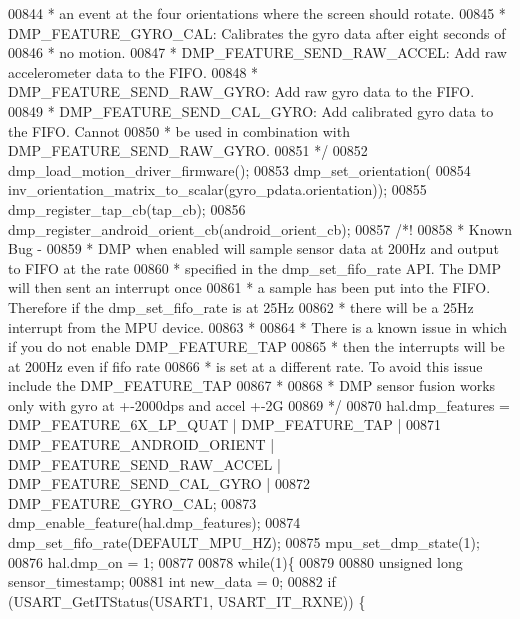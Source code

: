 \begin{DoxyCode}
{{{{{{{{00844 \textcolor{comment}{     * an event at the four orientations where the screen should rotate.}
00845 \textcolor{comment}{     * DMP\_FEATURE\_GYRO\_CAL: Calibrates the gyro data after eight seconds of}
00846 \textcolor{comment}{     * no motion.}
00847 \textcolor{comment}{     * DMP\_FEATURE\_SEND\_RAW\_ACCEL: Add raw accelerometer data to the FIFO.}
00848 \textcolor{comment}{     * DMP\_FEATURE\_SEND\_RAW\_GYRO: Add raw gyro data to the FIFO.}
00849 \textcolor{comment}{     * DMP\_FEATURE\_SEND\_CAL\_GYRO: Add calibrated gyro data to the FIFO. Cannot}
00850 \textcolor{comment}{     * be used in combination with DMP\_FEATURE\_SEND\_RAW\_GYRO.}
00851 \textcolor{comment}{     */}
00852     dmp\_load\_motion\_driver\_firmware();
00853     dmp\_set\_orientation(
00854         inv\_orientation\_matrix\_to\_scalar(gyro\_pdata.orientation));
00855     dmp\_register\_tap\_cb(tap\_cb);
00856     dmp\_register\_android\_orient\_cb(android\_orient\_cb);
00857     \textcolor{comment}{/*!}
00858 \textcolor{comment}{     * Known Bug -}
00859 \textcolor{comment}{     * DMP when enabled will sample sensor data at 200Hz and output to FIFO at the rate}
00860 \textcolor{comment}{     * specified in the dmp\_set\_fifo\_rate API. The DMP will then sent an interrupt once}
00861 \textcolor{comment}{     * a sample has been put into the FIFO. Therefore if the dmp\_set\_fifo\_rate is at 25Hz}
00862 \textcolor{comment}{     * there will be a 25Hz interrupt from the MPU device.}
00863 \textcolor{comment}{     *}
00864 \textcolor{comment}{     * There is a known issue in which if you do not enable DMP\_FEATURE\_TAP}
00865 \textcolor{comment}{     * then the interrupts will be at 200Hz even if fifo rate}
00866 \textcolor{comment}{     * is set at a different rate. To avoid this issue include the DMP\_FEATURE\_TAP}
00867 \textcolor{comment}{     *}
00868 \textcolor{comment}{     * DMP sensor fusion works only with gyro at +-2000dps and accel +-2G}
00869 \textcolor{comment}{     */}
00870     hal.dmp\_features = DMP\_FEATURE\_6X\_LP\_QUAT | DMP\_FEATURE\_TAP |
00871         DMP\_FEATURE\_ANDROID\_ORIENT | DMP\_FEATURE\_SEND\_RAW\_ACCEL | DMP\_FEATURE\_SEND\_CAL\_GYRO |
00872         DMP\_FEATURE\_GYRO\_CAL;
00873     dmp\_enable\_feature(hal.dmp\_features);
00874     dmp\_set\_fifo\_rate(DEFAULT_MPU_HZ);
00875     mpu\_set\_dmp\_state(1);
00876     hal.dmp_on = 1;
00877 
00878   \textcolor{keywordflow}{while}(1)\{
00879 
00880     \textcolor{keywordtype}{unsigned} \textcolor{keywordtype}{long} sensor\_timestamp;
00881     \textcolor{keywordtype}{int} new\_data = 0;
00882     \textcolor{keywordflow}{if} (USART_GetITStatus(USART1, USART_IT_RXNE)) \{
}}}}}}}}
\end{DoxyCode}
